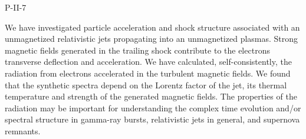 P-II-7


\bigskip



\bigskip

\noindent We have investigated particle acceleration and shock structure associated with an unmagnetized relativistic jets propagating into an unmagnetized plasmas. Strong magnetic fields generated in the trailing shock contribute to the electrons transverse deflection and acceleration. We have calculated, self-consistently, the radiation from electrons accelerated in the turbulent magnetic fields. We found that the synthetic spectra depend on the Lorentz factor of the jet, its thermal temperature and strength of the generated magnetic fields. The properties of the radiation may be important for understanding the complex time evolution and/or spectral structure in gamma-ray bursts, relativistic jets in general, and supernova remnants.
